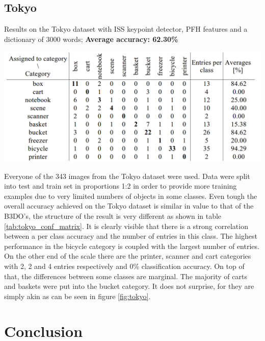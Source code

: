 \documentclass[12pt]{article}
\begin{document}
  \subsection{Tokyo}
    \begin{table}[!ht]
    \centering
    \caption{Results on the Tokyo dataset with ISS keypoint detector, PFH 
features and a dictionary of 3000 words; \textbf{Average accuracy: 62.30\%}}
    \includegraphics[width=1\textwidth]{figs/tokyo_conf_matrix}	
    \label{tab:tokyo_conf_matrix}
    \end{table}

    Everyone of the 343 images from the Tokyo dataset were used. Data were 
split into test and train set in proportions 1:2 in order to provide more 
training examples due to very limited numbers of objects in some classes. Even 
tough the overall accuracy achieved on the Tokyo dataset is similar in value to 
that of the B3DO's, the structure of the result is very different as shown in 
table \ref{tab:tokyo_conf_matrix}. It is clearly visible that there is a strong 
correlation between a per class accuracy and the number of entries in this 
class. The highest performance in the bicycle category is coupled with the 
largest number of entries. On the other end of the scale there are the printer, 
scanner and cart categories with 2, 2 and 4 entries respectively and 0\% 
classification accuracy. On top of that, the differences between some classes 
are marginal. The majority of carts and baskets were put into the bucket 
category. It does not surprise, for they are simply akin as can be seen in 
figure \ref{fig:tokyo}.

\section{ Conclusion }
\end{document}
